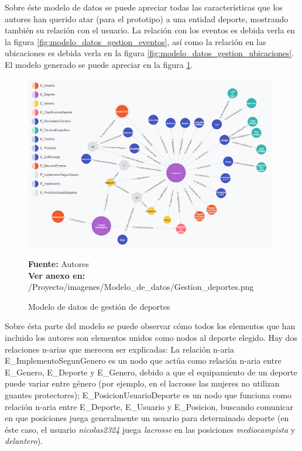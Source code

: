 Sobre éste modelo de datos se puede apreciar todas las características que los autores han querido atar (para el prototipo) a una entidad deporte, mostrando también su relación con el usuario. La relación con los eventos es debida verla en la figura \ref{fig:modelo_datos_gestion_eventos}, así como la relación en las ubicaciones es debida verla en la figura \ref{fig:modelo_datos_gestion_ubicaciones}. El modelo generado se puede apreciar en la figura \ref{fig:modelo_datos_gestion_deportes}.

\begin{figure}[!htb]
  \begin{center}
    \includegraphics[width=11cm]{./imagenes/Modelo_de_datos/Gestion_deportes.png}
    \caption{Modelo de datos de gestión de deportes}
    \label{fig:modelo_datos_gestion_deportes}
    \textbf{Fuente:}  Autores \\
    \textbf{Ver anexo en:} /Proyecto/imagenes/Modelo\_de\_datos/Gestion\_deportes.png
  \end{center}
\end{figure}

Sobre ésta parte del modelo se puede observar cómo todos los elementos que han incluido los autores son elementos unidos como nodos al deporte elegido. Hay dos relaciones n-arias que merecen ser explicadas: La relación n-aria E\_ImplementoSegunGenero es un nodo que actúa como relación n-aria entre E\_Genero, E\_Deporte y E\_Genero, debido a que el equipamiento de un deporte puede variar entre género (por ejemplo, en el lacrosse las mujeres no utilizan guantes protectores); E\_PosicionUsuarioDeporte es un nodo que funciona como relación n-aria entre E\_Deporte, E\_Usuario y E\_Posicion, buscando comunicar en que posiciones juega generalmente un usuario para determinado deporte (en éste caso, el usuario \textit{nicolas2324} juega \textit{lacrosse} en las posiciones \textit{mediocampista} y \textit{delantero}).

